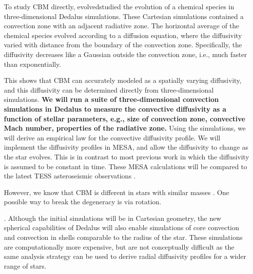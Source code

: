 To study CBM directly, \citet{Lecoanet_2016a} evolvedstudied the evolution of a chemical species in three-dimensional Dedalus simulations.  These Cartesian simulations contained a convection zone with an adjacent radiative zone. The horizontal average of the chemical species evolved according to a diffusion equation, where the diffusivity varied with distance from the boundary of the convection zone. Specifically, the diffusivity decreases like a Gaussian outside the convection zone, i.e., much faster than exponentially.

This shows that CBM can accurately modeled as a spatially varying diffusivity, and this diffusivity can be determined directly from three-dimensional simulations. \textbf{We will run a suite of three-dimensional convection simulations in Dedalus to measure the convective diffusivity as a function of stellar parameters, e.g., size of convection zone, convective Mach number, properties of the radiative zone.} Using the simulations, we will derive an empirical law for the convective diffusivity profile. We will implement the diffusivity profiles in MESA, and allow the diffusivity to change as the star evolves. This is in contrast to most previous work in which the diffusivity is assumed to be constant in time. These MESA calculations will be compared to the latest TESS asteroseismic observations \citep[similar to][]{Ghasemi_2016}.

However, we know that CBM is different in stars with similar masses \citep{Stancliffe_2015}. One possible way to break the degeneracy is via rotation. 

. Although the initial simulations will be in Cartesian geometry, the new spherical capabilities of Dedalus will also enable simulations of core convection and convection in shells comparable to the radius of the star. These simulations are computationally more expensive, but are not conceptually difficult as the same analysis strategy can be used to derive radial diffusivity profiles for a wider range of stars.
